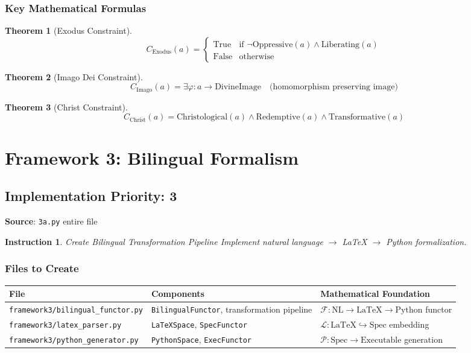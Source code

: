 \documentclass[12pt]{article}
\newtheorem{instruction}{Instruction}
\newtheorem{theorem}{Theorem}
\begin{document}
\subsubsection{Key Mathematical Formulas}

\begin{theorem}[Exodus Constraint]
\[
C_{\text{Exodus}}(a) = \begin{cases}
\text{True} & \text{if } \neg\text{Oppressive}(a) \land \text{Liberating}(a) \\
\text{False} & \text{otherwise}
\end{cases}
\]
\end{theorem}

\begin{theorem}[Imago Dei Constraint]
\[
C_{\text{Imago}}(a) = \exists \varphi: a \to \text{DivineImage} \quad \text{(homomorphism preserving image)}
\]
\end{theorem}

\begin{theorem}[Christ Constraint]
\[
C_{\text{Christ}}(a) = \text{Christological}(a) \land \text{Redemptive}(a) \land \text{Transformative}(a)
\]
\end{theorem}

\section{Framework 3: Bilingual Formalism}

\subsection{Implementation Priority: 3}
\textbf{Source}: \texttt{3a.py} entire file

\begin{instruction}{Create Bilingual Transformation Pipeline}
Implement natural language $\to$ LaTeX $\to$ Python formalization.
\end{instruction}

\subsubsection{Files to Create}

\begin{longtable}{|p{}|p{}|p{}|}
\hline
\textbf{File} & \textbf{Components} & \textbf{Mathematical Foundation} \\
\hline
\texttt{framework3/bilingual\_functor.py} & \texttt{BilingualFunctor}, transformation pipeline & $\mathcal{F}: \text{NL} \to \text{LaTeX} \to \text{Python}$ functor \\
\hline
\texttt{framework3/latex\_parser.py} & \texttt{LaTeXSpace}, \texttt{SpecFunctor} & $\mathcal{L}: \text{LaTeX} \hookrightarrow \text{Spec}$ embedding \\
\hline
\texttt{framework3/python\_generator.py} & \texttt{PythonSpace}, \texttt{ExecFunctor} & $\mathcal{P}: \text{Spec} \to \text{Executable}$ generation \\
\hline
\end{longtable}
\end{document}
